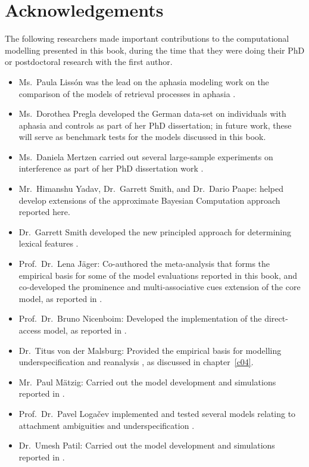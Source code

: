 
\chapter*{Acknowledgements}

The following researchers made important contributions to the  computational modelling presented in this book, during the time that they were doing their PhD or postdoctoral research with the first author.
\begin{itemize}
\item Ms.\ Paula Liss{\'o}n was the lead on the aphasia modeling work on the comparison of the models of retrieval processes in aphasia \citep{LissonEtAl2020}.
\item Ms.\ Dorothea Pregla developed the German data-set on individuals with aphasia and  controls as part of her PhD dissertation; in future work, these will serve as benchmark tests for the models discussed in this book.
\item Ms.\ Daniela Mertzen carried out several large-sample experiments on interference as part of her PhD dissertation work \citep{MertzenEtAlAMLaP2019}.  
\item Mr.\ Himanshu Yadav, Dr.\ Garrett Smith, and Dr.\ Dario Paape: helped develop extensions of the approximate Bayesian Computation approach  reported here. 
\item Dr.\ Garrett Smith developed the new principled approach for determining lexical features \citep{smith2019smithvasishthfeatures}. 
\item Prof.\ Dr.\  Lena J\"ager: Co-authored the meta-analysis \citep{JaegerEngelmannVasishth2017} that forms the empirical basis for some of the model evaluations reported in this book, and co-developed the prominence and multi-associative cues extension of the core model, as reported in \cite{EngelmannJaegerVasishth2019}.
\item Prof.\ Dr.\  Bruno  Nicenboim: Developed the implementation of the direct-access model, as reported in \cite{NicenboimRetrieval2018}.
 \item Dr.\ Titus von der Malsburg: Provided the empirical  basis for  modelling underspecification and reanalysis \citep{MalsburgVasishth2013}, as discussed in chapter~\ref{c04}.
 \item Mr.\ Paul M\"atzig: Carried out the model development and simulations reported in \cite{MaetzigEtAltopics2018}.
 \item Prof.\ Dr.\ Pavel Loga{\v c}ev implemented and tested several models relating to attachment ambiguities and underspecification \citep{LogacevMultiple,LogacevVasishthQJEP2016}. 
 \item Dr.\ Umesh Patil: Carried out the model development and simulations reported in \cite{PatilEtAl2016}.
 \end{itemize}

